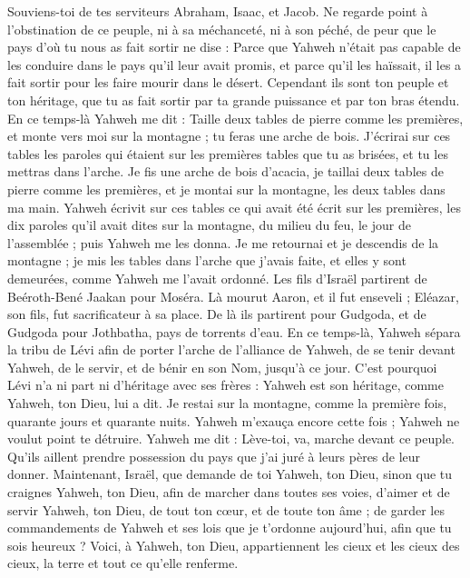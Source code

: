 \begin{multicols}{2}
Souviens-toi de tes serviteurs Abraham, Isaac, et Jacob. Ne regarde point à l’obstination de ce peuple, ni à sa méchanceté, ni à son péché,
de peur que le pays d’où tu nous as fait sortir ne dise : Parce que Yahweh n’était pas capable de les conduire dans le pays qu’il leur avait promis, et parce qu’il les haïssait, il les a fait sortir pour les faire mourir dans le désert.
Cependant ils sont ton peuple et ton héritage, que tu as fait sortir par ta grande puissance et par ton bras étendu.
\VerseOne{}En ce temps-là Yahweh me dit : Taille deux tables de pierre comme les premières, et monte vers moi sur la montagne ; tu feras une arche de bois\FTNT{}.
J'écrirai sur ces tables les paroles qui étaient sur les premières tables que tu as brisées, et tu les mettras dans l'arche.
Je fis une arche de bois d’acacia, je taillai deux tables de pierre comme les premières, et je montai sur la montagne, les deux tables dans ma main.
Yahweh écrivit sur ces tables ce qui avait été écrit sur les premières, les dix paroles qu’il avait dites sur la montagne, du milieu du feu, le jour de l'assemblée ; puis Yahweh me les donna.
Je me retournai et je descendis de la montagne ; je mis les tables dans l'arche que j'avais faite, et elles y sont demeurées, comme Yahweh me l'avait ordonné.
Les fils d'Israël partirent de Beéroth-Bené Jaakan pour Moséra. Là mourut Aaron, et il fut enseveli ; Eléazar, son fils, fut sacrificateur à sa place.
De là ils partirent pour Gudgoda, et de Gudgoda pour Jothbatha, pays de torrents d'eau.
En ce temps-là, Yahweh sépara la tribu de Lévi afin de porter l'arche de l'alliance de Yahweh, de se tenir devant Yahweh, de le servir, et de bénir en son Nom, jusqu'à ce jour.
C'est pourquoi Lévi n'a ni part ni d'héritage avec ses frères : Yahweh est son héritage, comme Yahweh, ton Dieu, lui a dit.
Je restai sur la montagne, comme la première fois, quarante jours et quarante nuits. Yahweh m'exauça encore cette fois ; Yahweh ne voulut point te détruire.
Yahweh me dit : Lève-toi, va, marche devant ce peuple. Qu'ils aillent prendre possession du pays que j'ai juré à leurs pères de leur donner.
Maintenant, Israël, que demande de toi Yahweh, ton Dieu, sinon que tu craignes Yahweh, ton Dieu, afin de marcher dans toutes ses voies, d’aimer et de servir Yahweh, ton Dieu, de tout ton cœur, et de toute ton âme ;
de garder les commandements de Yahweh et ses lois que je t’ordonne aujourd'hui, afin que tu sois heureux ?
Voici, à Yahweh, ton Dieu, appartiennent les cieux et les cieux des cieux, la terre et tout ce qu’elle renferme.

\end{multicols}
